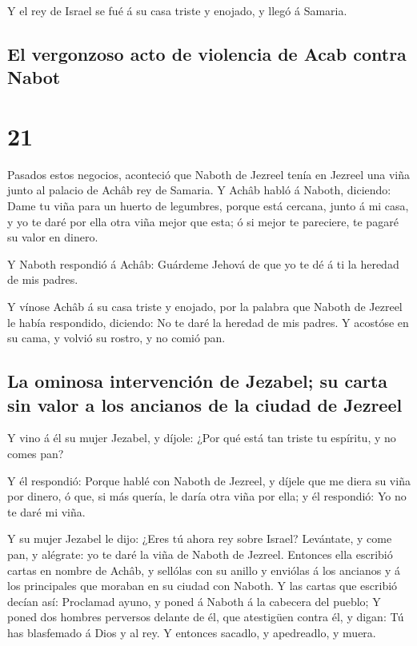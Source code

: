  Y el rey de Israel se fué á su casa triste y enojado, y
llegó á Samaria.

\hypertarget{el-vergonzoso-acto-de-violencia-de-acab-contra-nabot}{%
\subsection{El vergonzoso acto de violencia de Acab contra
Nabot}\label{el-vergonzoso-acto-de-violencia-de-acab-contra-nabot}}

\hypertarget{section-11-21}{%
\section{21}\label{section-11-21}}

 Pasados estos negocios, aconteció que Naboth de Jezreel
tenía en Jezreel una viña junto al palacio de Achâb rey de Samaria.
 Y Achâb habló á Naboth, diciendo: Dame tu viña para un
huerto de legumbres, porque está cercana, junto á mi casa, y yo te daré
por ella otra viña mejor que esta; ó si mejor te pareciere, te pagaré su
valor en dinero.

 Y Naboth respondió á Achâb: Guárdeme Jehová de que yo te
dé á ti la heredad de mis padres.

 Y vínose Achâb á su casa triste y enojado, por la palabra
que Naboth de Jezreel le había respondido, diciendo: No te daré la
heredad de mis padres. Y acostóse en su cama, y volvió su rostro, y no
comió pan.

\hypertarget{la-ominosa-intervenciuxf3n-de-jezabel-su-carta-sin-valor-a-los-ancianos-de-la-ciudad-de-jezreel}{%
\subsection{La ominosa intervención de Jezabel; su carta sin valor a los
ancianos de la ciudad de
Jezreel}\label{la-ominosa-intervenciuxf3n-de-jezabel-su-carta-sin-valor-a-los-ancianos-de-la-ciudad-de-jezreel}}

 Y vino á él su mujer Jezabel, y díjole: ¿Por qué está tan
triste tu espíritu, y no comes pan?

 Y él respondió: Porque hablé con Naboth de Jezreel, y
díjele que me diera su viña por dinero, ó que, si más quería, le daría
otra viña por ella; y él respondió: Yo no te daré mi viña.

 Y su mujer Jezabel le dijo: ¿Eres tú ahora rey sobre
Israel? Levántate, y come pan, y alégrate: yo te daré la viña de Naboth
de Jezreel.  Entonces ella escribió cartas en nombre de
Achâb, y sellólas con su anillo y enviólas á los ancianos y á los
principales que moraban en su ciudad con Naboth.  Y las
cartas que escribió decían así: Proclamad ayuno, y poned á Naboth á la
cabecera del pueblo;  Y poned dos hombres perversos
delante de él, que atestigüen contra él, y digan: Tú has blasfemado á
Dios y al rey. Y entonces sacadlo, y apedreadlo, y muera.

